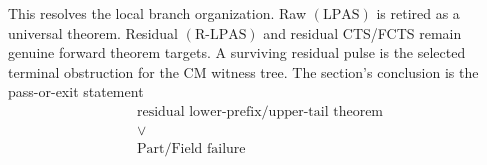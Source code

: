 This resolves the local branch organization.  Raw \((\mathrm{LPAS})\) is
retired as a universal theorem.  Residual \((\mathrm{R\text{-}LPAS})\) and
residual CTS/FCTS remain genuine forward theorem targets.  A surviving
residual pulse is the selected terminal obstruction for the CM witness tree.
The section's conclusion is the pass-or-exit statement
\[
  \boxed{
  \begin{gathered}
  \text{residual lower-prefix/upper-tail theorem}\\
  \vee\\
  \text{Part/Field failure}
  \end{gathered}}
\]
